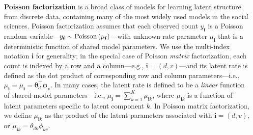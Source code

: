 \documentclass[letterpaper]{article}
\newcommand{\subs}{\pmb{i}}
\newcommand{\ys}{y_{\subs}}
\newcommand{\mus}{\mu_{\subs}}
\newcommand{\musk}{\mu_{\subs k}}
\newcommand{\Pois}[1]{\textup{Poisson}\left( #1 \right)}
\newcommand{\teq}{\!=\!}
\begin{document}
  \textbf{Poisson factorization}
  \citep{titsias2008infinite,cemgil2009bayesian,zhou2012augment,gopalan2013efficient,paisley2014bayesian}
  is a broad class of models for learning latent structure from discrete data,
  containing many of the most widely used models in the social sciences.
  Poisson factorization assumes that each observed count $\ys$ is a Poisson
  random variable---$\ys \sim \Pois{\mus}$---with unknown rate parameter $\mus$
  that is a deterministic function of shared model parameters. We use the
  multi-index notation $\subs$ for generality; in the special case of Poisson
  \emph{matrix} factorization, each count is indexed by a row and a
  column---e.g., $\subs \!=\! (d, v)$---and its latent rate is defined as the
  dot product of corresponding row and column parameters---i.e., $\mus \teq
  \mu_{\subs} \teq \boldsymbol{\theta}_d^{\top} \boldsymbol{\phi}_v$. In many
  cases, the latent rate is defined to be a \emph{linear} function of shared
  model parameters---i.e., $\mus = \sum_{k=1}^K \musk$, where $\musk$ is a
  function of latent parameters specific to latent component $k$. In Poisson
  matrix factorization, we define $\musk$ as the product of the latent
  parameters associated with $\subs = (d, v)$, or $\musk =
  \theta_{dk}\phi_{kv}$.
  
\end{document}
